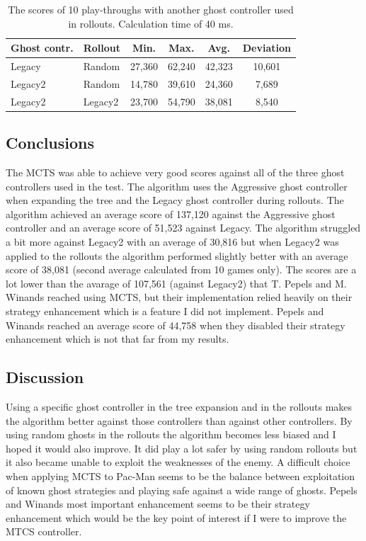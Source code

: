 \documentclass[conference]{IEEEtran}
\begin{document}
\begin{table}
\begin{center}
\caption{The scores of 10 play-throughs with another ghost controller used in rollouts. Calculation time of 40 ms. }
\label{MCTSscoresRollout}
\begin{tabular}{|l|l|c|c|c|c|}
\hline
Ghost contr. & Rollout & Min. & Max. & Avg. & Deviation \\
\hline
Legacy & Random & 27,360 & 62,240 & 42,323 & 10,601\\
\hline
Legacy2 & Random & 14,780 & 39,610 & 24,360 & 7,689 \\
\hline
Legacy2 & Legacy2 & 23,700 & 54,790 & 38,081 & 8,540 \\
\hline
\end{tabular}
\end{center}
\end{table}


\subsection{Conclusions}
The MCTS was able to achieve very good scores against all of the three ghost controllers used in the test. The algorithm uses the Aggressive ghost controller when expanding the tree and the Legacy ghost controller during rollouts. The algorithm achieved an average score of 137,120 against the Aggressive ghost controller and an average score of 51,523 against Legacy. The algorithm struggled a bit more against Legacy2 with an average of 30,816 but when Legacy2 was applied to the rollouts the algorithm performed slightly better with an average score of 38,081 (second average calculated from 10 games only). The scores are a lot lower than the avarage of 107,561 (against Legacy2) that T. Pepels and M. Winands \cite{MCTS-Pac-Man} reached using MCTS, but their implementation relied heavily on their strategy enhancement which is a feature I did not implement. Pepels and Winands reached an average score of 44,758 when they disabled their strategy enhancement which is not that far from my results.

\subsection{Discussion}
Using a specific ghost controller in the tree expansion and in the rollouts makes the algorithm better against those controllers than against other controllers. By using random ghosts in the rollouts the algorithm becomes less biased and I hoped it would also improve. It did play a lot safer by using random rollouts but it also became unable to exploit the weaknesses of the enemy. A difficult choice when applying MCTS to Pac-Man seems to be the balance between exploitation of known ghost strategies and playing safe against a wide range of ghosts. Pepels and Winands most important enhancement seems to be their strategy enhancement which would be the key point of interest if I were to improve the MTCS controller.
\end{document}

